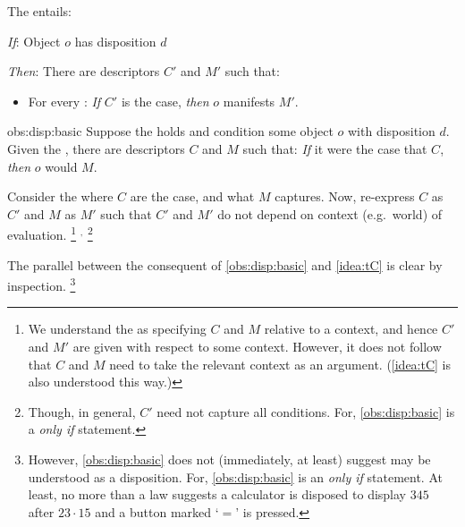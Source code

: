 \begin{note}
  \begin{proposition}%
    \label{obs:disp:basic}%
    The  entails:

    \begin{itenum}
    \item[\emph{If}:]
      Object \(o\) has disposition \(d\)
    \item[\emph{Then}:]
      There are descriptors \(C'\) and \(M'\) such that:
      \begin{itemize}
      \item
        For every :
        \emph{If} \(C'\) is the case, \emph{then} \(o\) manifests \(M'\).
      \end{itemize}
    \end{itenum}
    \vspace{-\baselineskip}
  \end{proposition}

  \begin{argument}{obs:disp:basic}
    Suppose the  holds and condition some object \(o\) with disposition \(d\).
    Given the , there are descriptors \(C\) and \(M\) such that:
    \emph{If} it were the case that \(C\), \emph{then} \(o\) would \(M\).

    Consider the  where \(C\) are the case, and what \(M\) captures.
    Now, re-express \(C\) as \(C'\) and \(M\) as \(M'\) such that \(C'\) and \(M'\) do not depend on context (e.g.\ world) of evaluation.%
    \footnote{
      We understand the \dBCAa{} as specifying \(C\) and \(M\) relative to a context, and hence \(C'\) and \(M'\) are given with respect to some context.
      However, it does not follow that \(C\) and \(M\) need to take the relevant context as an argument.
      (\autoref{idea:tC} is also understood this way.)
    }%
    \(^{,}\)%
    \footnote{
      Though, in general, \(C'\) need not capture all conditions.
      For, \autoref{obs:disp:basic} is a \emph{only if} statement.
    }
  \end{argument}
  The parallel between the consequent of \autoref{obs:disp:basic} and \autoref{idea:tC} is clear by inspection.%
  \footnote{
    However, \autoref{obs:disp:basic} does not (immediately, at least) suggest \tCV{} may be understood as a disposition.
    For, \autoref{obs:disp:basic} is an \emph{only if} statement.
    At least, no more than a law suggests a calculator is disposed to display \(345\) after \(23 \cdot 15\) and a button marked `\(=\)' is pressed.
  }
\end{note}

